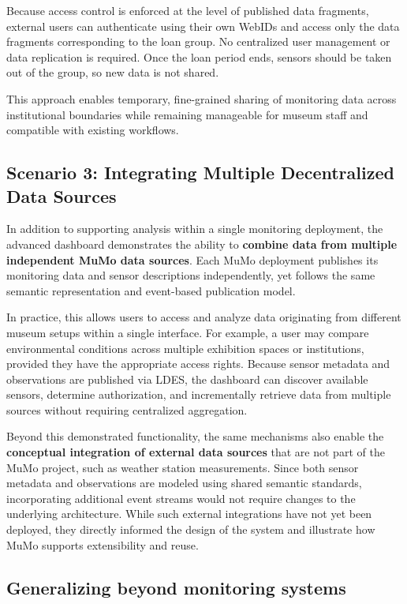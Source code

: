 Because access control is enforced at the level of published data
fragments, external users can authenticate using their own WebIDs and
access only the data fragments corresponding to the loan group. No
centralized user management or data replication is required. Once the
loan period ends, sensors should be taken out of the group, so new data
is not shared.

This approach enables temporary, fine-grained sharing of monitoring data
across institutional boundaries while remaining manageable for museum
staff and compatible with existing workflows.

\subsection{Scenario 3: Integrating Multiple Decentralized Data
Sources}\label{scenario-3-integrating-multiple-decentralized-data-sources}

In addition to supporting analysis within a single monitoring
deployment, the advanced dashboard demonstrates the ability to
\textbf{combine data from multiple independent MuMo data sources}. Each
MuMo deployment publishes its monitoring data and sensor descriptions
independently, yet follows the same semantic representation and
event-based publication model.

In practice, this allows users to access and analyze data originating
from different museum setups within a single interface. For example, a
user may compare environmental conditions across multiple exhibition
spaces or institutions, provided they have the appropriate access
rights. Because sensor metadata and observations are published via LDES,
the dashboard can discover available sensors, determine authorization,
and incrementally retrieve data from multiple sources without requiring
centralized aggregation.

Beyond this demonstrated functionality, the same mechanisms also enable
the \textbf{conceptual integration of external data sources} that are
not part of the MuMo project, such as weather station measurements.
Since both sensor metadata and observations are modeled using shared
semantic standards, incorporating additional event streams would not
require changes to the underlying architecture. While such external
integrations have not yet been deployed, they directly informed the
design of the system and illustrate how MuMo supports extensibility and
reuse.

\subsection{Generalizing beyond monitoring
systems}\label{generalizing-beyond-monitoring-systems}

